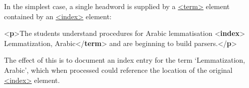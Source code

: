 In the simplest case, a single headword is supplied by a \hyperref[TEI.term]{<term>} element contained by an \hyperref[TEI.index]{<index>} element: \par\bgroup{}\exampleFont \begin{shaded}\noindent\mbox{}{<\textbf{p}>}The students understand procedures for Arabic lemmatisation\mbox{}\newline 
{<\textbf{index}>}\mbox{}\newline 
\hspace*{1em}Lemmatization, Arabic{</\textbf{term}>}\mbox{}\newline 
{}and are beginning to build parsers.{</\textbf{p}>}\end{shaded}\egroup\par \par
The effect of this is to document an index entry for the term ‘Lemmatization, Arabic’, which when processed could reference the location of the original \hyperref[TEI.index]{<index>} element.\par
